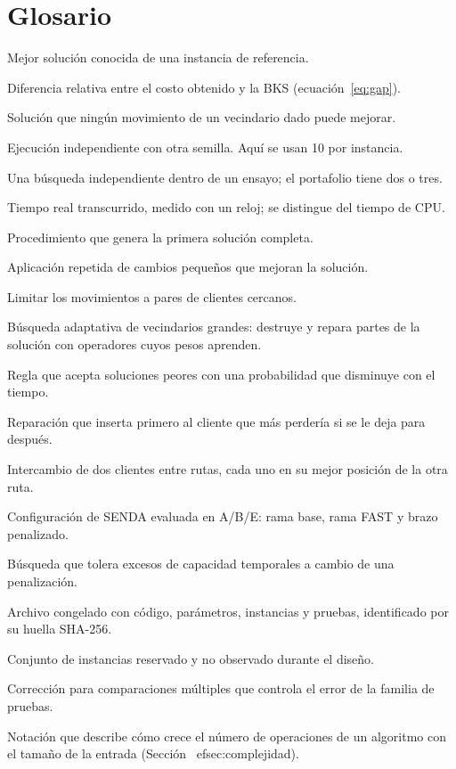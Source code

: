 \documentclass[11pt,a4paper]{article}
\begin{document}
\section{Glosario}
\label{app:glosario}
\begin{description}[leftmargin=0pt,font=\bfseries]
\item[BKS] Mejor solución conocida de una instancia de referencia.
\item[Gap] Diferencia relativa entre el costo obtenido y la BKS (ecuación~\ref{eq:gap}).
\item[Óptimo local] Solución que ningún movimiento de un vecindario dado puede mejorar.
\item[Réplica] Ejecución independiente con otra semilla. Aquí se usan 10 por instancia.
\item[Brazo] Una búsqueda independiente dentro de un ensayo; el portafolio tiene dos o tres.
\item[Tiempo de pared] Tiempo real transcurrido, medido con un reloj; se distingue del tiempo de CPU.
\item[Construcción] Procedimiento que genera la primera solución completa.
\item[Búsqueda local] Aplicación repetida de cambios pequeños que mejoran la solución.
\item[Restricción granular] Limitar los movimientos a pares de clientes cercanos.
\item[ALNS] Búsqueda adaptativa de vecindarios grandes: destruye y repara partes de la solución con
operadores cuyos pesos aprenden.
\item[Recocido simulado] Regla que acepta soluciones peores con una probabilidad que disminuye con el
tiempo.
\item[Regret-2] Reparación que inserta primero al cliente que más perdería si se le deja para
después.
\item[SWAP*] Intercambio de dos clientes entre rutas, cada uno en su mejor posición de la otra ruta.
\item[Portafolio] Configuración de SENDA evaluada en A/B/E: rama base, rama FAST y brazo penalizado.
\item[Brazo penalizado] Búsqueda que tolera excesos de capacidad temporales a cambio de una
penalización.
\item[Contrato] Archivo congelado con código, parámetros, instancias y pruebas, identificado por su
huella SHA-256.
\item[Holdout] Conjunto de instancias reservado y no observado durante el diseño.
\item[Holm] Corrección para comparaciones múltiples que controla el error de la familia de pruebas.
\item[$O$ grande] Notación que describe cómo crece el número de operaciones de un algoritmo con el
tamaño de la entrada (Sección~
ef{sec:complejidad}).
\end{description}
\end{document}
